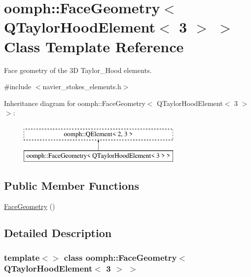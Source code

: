 \hypertarget{classoomph_1_1FaceGeometry_3_01QTaylorHoodElement_3_013_01_4_01_4}{}\section{oomph\+:\+:Face\+Geometry$<$ Q\+Taylor\+Hood\+Element$<$ 3 $>$ $>$ Class Template Reference}
\label{classoomph_1_1FaceGeometry_3_01QTaylorHoodElement_3_013_01_4_01_4}


Face geometry of the 3D Taylor\+\_\+\+Hood elements.  




{\ttfamily \#include $<$navier\+\_\+stokes\+\_\+elements.\+h$>$}

Inheritance diagram for oomph\+:\+:Face\+Geometry$<$ Q\+Taylor\+Hood\+Element$<$ 3 $>$ $>$\+:\begin{figure}[H]
\begin{center}
\leavevmode
\includegraphics[height=2.000000cm]{classoomph_1_1FaceGeometry_3_01QTaylorHoodElement_3_013_01_4_01_4}
\end{center}
\end{figure}
\subsection*{Public Member Functions}
\begin{DoxyCompactItemize}
\item 
\hyperlink{classoomph_1_1FaceGeometry_3_01QTaylorHoodElement_3_013_01_4_01_4_af70fe1e6c46e673849610368db48b60e}{Face\+Geometry} ()
\end{DoxyCompactItemize}


\subsection{Detailed Description}
\subsubsection*{template$<$$>$\newline
class oomph\+::\+Face\+Geometry$<$ Q\+Taylor\+Hood\+Element$<$ 3 $>$ $>$}

